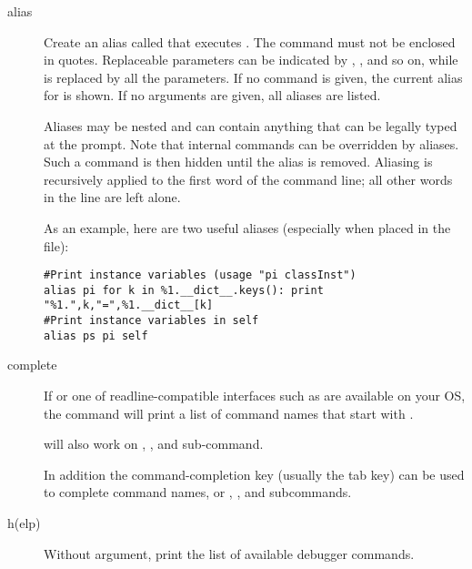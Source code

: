 \begin{description}

\item[alias ]\label{command:aliases}

Create an alias called  that executes .  The
command must not be enclosed in quotes.  Replaceable parameters
can be indicated by , , and so on, while \samp{\%*} is
replaced by all the parameters.  If no command is given, the current
alias for  is shown. If no arguments are given, all
aliases are listed.

Aliases may be nested and can contain anything that can be legally
typed at the  prompt.  Note that internal 
commands can be overridden by aliases.  Such a command is then hidden
until the alias is removed.  Aliasing is recursively applied to the
first word of the command line; all other words in the line are left
alone.

As an example, here are two useful aliases (especially when placed
in the  file):

\begin{verbatim}
#Print instance variables (usage "pi classInst")
alias pi for k in %1.__dict__.keys(): print "%1.",k,"=",%1.__dict__[k]
#Print instance variables in self
alias ps pi self
\end{verbatim}
                
\item[complete ]\label{command:complete}

If
or one of readline-compatible interfaces such as
are available on your OS, the  command will print a
list of command names that start with .

 will also work on , , and
 sub-command. 

In addition the command-completion key (usually the tab key) can be
used to complete command names, or , , and
 subcommands.

\item[h(elp) ]

Without argument, print the list of available debugger commands.


\end{description}
